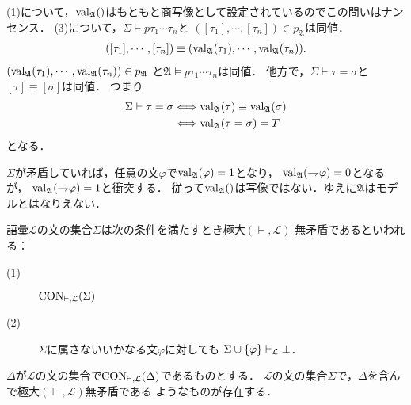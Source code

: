 	\begin{sketch}
		(1)について，$\operatorname{val}_{\mathfrak{A}}()$はもともと商写像として設定されているのでこの問いはナンセンス．
		(3)について，$\Sigma \vdash p\tau_{1}\cdots\tau_{n}$と
			$([\tau_{1}],\cdots,[\tau_{n}]) \in p_{\mathfrak{A}}$は同値．
			\begin{align}
				([\tau_{1}],\cdots,[\tau_{n}]) \equiv 
				(\operatorname{val}_{\mathfrak{A}}(\tau_{1}),\cdots,\operatorname{val}_{\mathfrak{A}}(\tau_{n})).
			\end{align}
			$(\operatorname{val}_{\mathfrak{A}}(\tau_{1}),\cdots,\operatorname{val}_{\mathfrak{A}}(\tau_{n})) \in p_{\mathfrak{A}}$
			と$\mathfrak{A} \models p\tau_{1}\cdots\tau_{n}$は同値．
			他方で，$\Sigma \vdash \tau = \sigma$と$[\tau] \equiv [\sigma]$は同値．
			つまり
			\begin{align}
				\Sigma \vdash \tau = \sigma 
				&\Longleftrightarrow 
				\operatorname{val}_{\mathfrak{A}}(\tau) \equiv \operatorname{val}_{\mathfrak{A}}(\sigma) \\
				&\Longleftrightarrow \operatorname{val}_{\mathfrak{A}}(\tau = \sigma) = T
			\end{align}
			となる．
	\end{sketch}
	
	$\Sigma$が矛盾していれば，任意の文$\varphi$で$\operatorname{val}_{\mathfrak{A}}(\varphi) = 1$となり，
	$\operatorname{val}_{\mathfrak{A}}(\rightharpoondown\hspace{-0.25em} \varphi) = 0$となるが，
	$\operatorname{val}_{\mathfrak{A}}(\rightharpoondown\hspace{-0.25em}\varphi) = 1$と衝突する．
	従って$\operatorname{val}_{\mathfrak{A}}()$は写像ではない．ゆえに$\mathfrak{A}$はモデルとはなりえない．
	
	\begin{screen}
		\begin{dfn}[定義2.12.11]
			語彙$\mathcal{L}$の文の集合$\Sigma$は次の条件を満たすとき極大$(\vdash,\mathcal{L})$
			無矛盾であるといわれる：
			\begin{description}
				\item[(1)] $\operatorname{CON}_{\vdash,\mathcal{L}}(\Sigma)$
				\item[(2)] $\Sigma$に属さないいかなる文$\varphi$に対しても
					$\Sigma \cup \{\varphi\} \vdash_{{\scriptsize \mathcal{L}}} \bot$．
			\end{description}
		\end{dfn}
	\end{screen}
	
	\begin{screen}
		\begin{thm}[補題2.12.12]
			$\Delta$が$\mathcal{L}$の文の集合で$\operatorname{CON}_{\vdash,\mathcal{L}}(\Delta)$であるものとする．
			$\mathcal{L}$の文の集合$\Sigma$で，$\Delta$を含んで極大$(\vdash,\mathcal{L})$無矛盾である
			ようなものが存在する．
		\end{thm}
	\end{screen}
	
